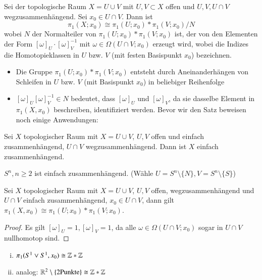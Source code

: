 \documentclass[a4paper,10pt]{scrartcl}
\begin{document}
\begin{st}\label{thm2:5.2}
 Sei der topologische Raum $X=U\cup V$ mit $U, V\subset X$ offen und $U,V, U\cap V$ wegzusammenhängend. Sei $x_0\in U\cap V$. Dann ist
\[
 \pi_1(X;x_0) \cong \pi_1(U;x_0)*\pi_1(V;x_0)/N
\]
wobei $N$ der Normalteiler von $\pi_1(U;x_0)*\pi_1(V;x_0)$ ist, der von den Elementen der Form $[\omega]_U\cdot [\omega]_V^{-1}$ mit $\omega\in \Omega(U\cap V; x_0)$ erzeugt wird, wobei die Indizes die Homotopieklassen in $U$ bzw. $V$ (mit festen Basispunkt $x_0$) bezeichnen.
\end{st}
\begin{note*}
 \begin{itemize}
  \item Die Gruppe $\pi_1(U;x_0)*\pi_1(V;x_0)$ entsteht durch Aneinanderhängen von Schleifen in $U$ bzw. $V$ (mit Basispunkt $x_0$) in beliebiger Reihenfolge
\begin{figure}[H]
\centering
\fixme[fig106]
\caption{}
\end{figure}
  \item $[\omega]_U[\omega]_V^{-1}\in N$ bedeutet, dass $[\omega]_U$ und $[\omega]_V$, da sie dasselbe Element in $\pi_1(X,x_0)$ beschreiben, identifiziert werden. Bevor wir den Satz beweisen noch einige Anwendungen:
 \end{itemize}
\end{note*}
\begin{kor}
 Sei $X$ topologischer Raum mit $X=U\cup V$, $U,V$ offen und einfach zusammenhängend, $U\cap V$ wegzusammenhängend. Dann ist $X$ einfach zusammenhängend.
\end{kor}
\begin{ex*}
 $S^n, n\ge 2$ ist einfach zusammenhängend. (Wähle $U=S^n\setminus\{N\}, V=S^n\setminus\{S\}$)
\end{ex*}
\begin{kor}
 Sei $X$ topologischer Raum mit $X=U\cup V$, $U,V$ offen, wegzusammenhängend und $U\cap V$ einfach zusammenhängend, $x_0\in U\cap V$, dann gilt $\pi_1(X,x_0)\cong \pi_1(U;x_0)*\pi_1(V;x_0)$.
\end{kor}
\begin{proof}
 Es gilt $[\omega]_U=1, [\omega]_V=1$, da alle $\omega \in \Omega(U\cap V;x_0)$ sogar in $U\cap V$ nullhomotop sind.
\end{proof}
\begin{ex*}
 \begin{enumerate}[(i)]
  \item $\pi_1(S^1\vee S^1, x_0)\cong \mathbb{Z}*\mathbb{Z}$
\begin{figure}[H]
 \centering
\fixme[fig107]
\caption{}
\end{figure}

  \item analog: $\mathbb{R}^2\setminus\{2 \text{Punkte}\}\cong \mathbb{Z}*\mathbb{Z}$
\begin{figure}[H]
 \centering
\fixme[fig108]
\caption{}
\end{figure}
 \end{enumerate}
\end{ex*}
\end{document}
